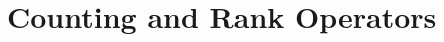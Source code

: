 \documentclass[../main/thesis.tex]{subfiles}
\begin{document}












\section{Counting and Rank Operators}
\end{document}
